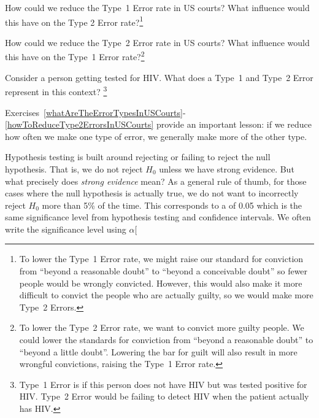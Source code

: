 \begin{exercise} \label{howToReduceType1ErrorsInUSCourts}
How could we reduce the Type~1 Error rate in US courts? What influence would this have on the Type 2 Error rate?\footnote{To lower the Type~1 Error rate, we might raise our standard for conviction from ``beyond a reasonable doubt'' to ``beyond a conceivable doubt'' so fewer people would be wrongly convicted. However, this would also make it more difficult to convict the people who are actually guilty, so we would make more Type~2 Errors.}
\end{exercise}

\begin{exercise} \label{howToReduceType2ErrorsInUSCourts}
How could we reduce the Type~2 Error rate in US courts? What influence would this have on the Type~1 Error rate?\footnote{To lower the Type~2 Error rate, we want to convict more guilty people. We could lower the standards for conviction from ``beyond a reasonable doubt'' to ``beyond a little doubt''. Lowering the bar for guilt will also result in more wrongful convictions, raising the Type~1 Error rate.}
\end{exercise}

\begin{exercise} \label{errorsinHIVTesting}
Consider a person getting tested for HIV. What does a Type~1 and Type~2 Error represent in this context? \footnote{Type~1 Error is if this person does not have HIV but was tested positive for HIV. Type~2 Error would be failing to detect HIV when the patient actually has HIV. }
\end{exercise}


Exercises~\ref{whatAreTheErrorTypesInUSCourts}-\ref{howToReduceType2ErrorsInUSCourts} provide an important lesson: if we reduce how often we make one type of error, we generally make more of the other type.

Hypothesis testing is built around rejecting or failing to reject the null hypothesis. That is, we do not reject $H_0$ unless we have strong evidence. But what precisely does \emph{strong evidence} mean? As a general rule of thumb, for those cases where the null hypothesis is actually true, we do not want to incorrectly reject $H_0$ more than 5\% of the time. This corresponds to a  of 0.05 which is the same significance level from hypothesis testing and confidence intervals. We often write the significance level using $\alpha$\marginpar[\raggedright\vspace{-4mm}

